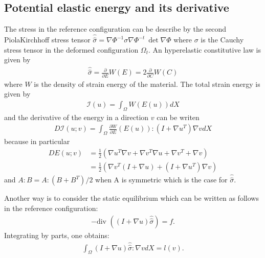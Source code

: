 \documentclass[a4paper,11pt,english]{sphinxmanual}
\begin{document}
\subsection{Potential elastic energy and its derivative}
\label{\detokenize{userdoc/model_nonlinear_elasticity:potential-elastic-energy-and-its-derivative}}
The stress in the reference configuration can be describe by the second Piola\sphinxhyphen{}Kirchhoff stress tensor \({\hat{\hat{\sigma}}} = \nabla\Phi^{-1}\sigma\nabla\Phi^{-t}~\det \nabla\Phi\) where \(\sigma\) is the Cauchy stress tensor in the deformed configuration \(\Omega_t\). An hyper\sphinxhyphen{}elastic constitutive law is given by
\begin{equation*}
\begin{split}{\hat{\hat{\sigma}}} = \frac{\partial}{\partial E} {W}(E) = 2\frac{\partial}{\partial C} {W}(C)\end{split}
\end{equation*}
where \({W}\) is the density of strain energy of the material. The total strain energy is given by
\begin{equation*}
\begin{split}\mathcal{I}(u) = \int_{\Omega} W( E(u)) dX\end{split}
\end{equation*}
and the derivative of the energy in a direction \(v\) can be writen
\begin{equation*}
\begin{split}D\mathcal{I}(u;v) = \int_{\Omega} \frac{\partial W}{\partial E}( E(u)):(I+{\nabla u^T}){\nabla v}  dX\end{split}
\end{equation*}
because in particular
\begin{equation*}
\begin{split}D E(u;v) &= \frac{1}{2}({\nabla u^T}{\nabla v} + {\nabla v^T}{\nabla u} + {\nabla v^T} + {\nabla v})\\
&= \frac{1}{2}({\nabla v^T}(I+{\nabla u}) + (I+{\nabla u^T}){\nabla v})\end{split}
\end{equation*}
and \(A:B = A:(B+B^T)/2\) when A is symmetric which is the case for \({\hat{\hat{\sigma}}}\).

Another way is to consider the static equilibrium which can be written as follows in the reference configuration:
\begin{equation*}
\begin{split}-\mbox{div } \left((I+{\nabla u}){\hat{\hat{\sigma}}}\right) = f.\end{split}
\end{equation*}
Integrating by parts, one obtains:
\begin{equation*}
\begin{split}\int_{\Omega}(I + {\nabla u}){\hat{\hat{\sigma}}} : {\nabla v}  dX = l(v).\end{split}
\end{equation*}
\end{document}

